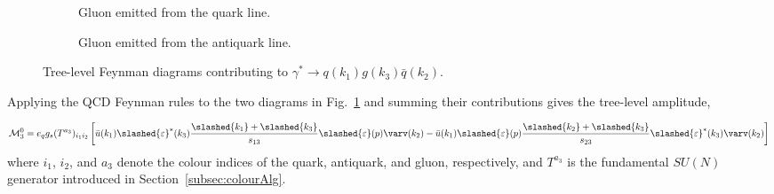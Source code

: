 \begin{figure}[h]
    \centering
    \begin{subfigure}[b]{0.45\textwidth}
        \centering
        \caption{Gluon emitted from the quark line.}
    \end{subfigure}
    \hfill
    \begin{subfigure}[b]{0.45\textwidth}
        \centering
        \caption{Gluon emitted from the antiquark line.}
    \end{subfigure}
    \caption{\centering Tree-level Feynman diagrams contributing to \(\gamma^*\to q(k_1)g(k_3)\bar q(k_2)\).}
    \label{fig:feynDiagsA30}
\end{figure}


Applying the QCD Feynman rules to the two diagrams in Fig.~\ref{fig:feynDiagsA30} and summing their
contributions gives the tree-level amplitude,

\begin{equation}\label{eq:M30amplitude}
    \begin{split}
        \mathcal M_3^0 = e_qg_s(T^{a_3})_{i_1i_2}\left[\bar u(k_1) \slashed{\varepsilon}^*(k_3)\frac{\slashed{k_1}+\slashed{k_3}}{s_{13}}\slashed{\varepsilon}(p)\varv(k_2)-\bar u(k_1) \slashed{\varepsilon}(p)\frac{\slashed{k_2}+\slashed{k_3}}{s_{23}}\slashed{\varepsilon}^*(k_3)\varv(k_2)\right]
    \end{split}
\end{equation}
where $i_1$, $i_2$, and $a_3$ denote the colour indices of the quark, antiquark, and gluon,
respectively, and $T^{a_3}$ is the fundamental $SU(N)$ generator introduced in
Section~\ref{subsec:colourAlg}.


